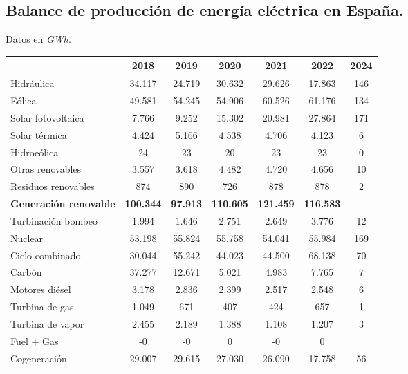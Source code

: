 		\subsection{Balance de producción de energía eléctrica en España.}
			Datos en \textit{GWh}.
			\begin{table}[htbp]
				\renewcommand{\arraystretch}{1.2}
				\centering
				\begin{tabular}{l|cccccc}
					& 2018 & 2019 & 2020 & 2021 & 2022 & 2024\\
					\hline
					Hidráulica            & 34.117  & 24.719 & 30.632  & 29.626  &  17.863 & 146\\
					Eólica                & 49.581  & 54.245 & 54.906  & 60.526  &  61.176 & 134\\
					Solar fotovoltaica    &  7.766  &  9.252 & 15.302  & 20.981  &  27.864 & 171\\
					Solar térmica         &  4.424  &  5.166 &  4.538  &  4.706  &   4.123 & 6\\
					Hidroeólica           & 24      & 23     & 20      & 23      &  23     & 0\\
					Otras renovables      &  3.557  &  3.618 &  4.482  &  4.720  &   4.656 & 10\\
					Residuos renovables   &  874    &  890   &  726    &  878    &   878   & 2\\
					\textbf{Generación renovable}  & \textbf{100.344} & \textbf{97.913} & \textbf{110.605} & \textbf{121.459} & \textbf{116.583} & \\
					Turbinación bombeo    &   1.994 &  1.646 &   2.751 &   2.649 &   3.776 & 12\\
					Nuclear               &  53.198 & 55.824 &  55.758 &  54.041 &  55.984 & 169\\
					Ciclo combinado       &  30.044 & 55.242 &  44.023 &  44.500 &  68.138 & 70\\
					Carbón                &  37.277 & 12.671 &   5.021 &   4.983 &   7.765 & 7\\
					Motores diésel        &   3.178 &  2.836 &   2.399 &   2.517 &   2.548 & 6\\
					Turbina de gas        &   1.049 &  671   &   407   &   424   &   657   & 1\\
					Turbina de vapor      &   2.455 &  2.189 &   1.388 &   1.108 &   1.207 & 3\\
					Fuel + Gas            &  -0     & -0     &   0     &  -0     &   0     & \\
					Cogeneración          &  29.007 & 29.615 &  27.030 &  26.090 &  17.758 & 56\\

\end{tabular}
\end{table}
